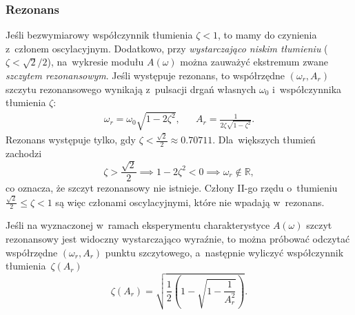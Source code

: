 \documentclass[paper=a4,DIV=12]{lpas}
\begin{document}
\begin{appendices}
  \subsubsection{Rezonans}
  \label{sec:8N4ZW}

  Jeśli bezwymiarowy współczynnik tłumienia $\zeta < 1$, to mamy do czynienia
  z~członem oscylacyjnym. Dodatkowo, przy {\em wystarczająco niskim tłumieniu}
  ($\zeta < \sqrt{2}/{2}$), na~wykresie modułu $A(\omega)$ można zauważyć
  ekstremum zwane {\em szczytem rezonansowym}. Jeśli występuje rezonans, to
  współrzędne $(\omega_r, A_r)$ szczytu rezonansowego wynikają z~pulsacji drgań
  własnych $\omega_0$ i~współczynnika tłumienia $\zeta$:
  \begin{equation}
    \begin{aligned}
      &
      \omega_r = \omega_0 \sqrt{1 - 2 \zeta^2},
      &&
      A_r = \frac{1}{2 \zeta \sqrt{1 - \zeta^2}}.
      &
    \end{aligned}
    \label{eq:EMIVT}
  \end{equation}
  Rezonans występuje tylko, gdy $\zeta < \frac{\sqrt{2}}{2} \approx 0.70711$.
  Dla~większych tłumień zachodzi
  \begin{equation}
    \zeta > \frac{\sqrt{2}}{2} \implies 1 - 2\zeta^2 < 0 \implies \omega_r \notin \mathbb{R},
  \end{equation}
  co oznacza, że szczyt rezonansowy nie istnieje. Człony II-go rzędu o~tłumieniu
  $\frac{\sqrt{2}}{2} \le \zeta < 1$ są więc członami oscylacyjnymi, które nie
  wpadają w~rezonans.

  Jeśli na wyznaczonej w~ramach eksperymentu charakterystyce $A(\omega)$ szczyt
  rezonansowy jest widoczny wystarczająco wyraźnie, to można próbować odczytać
  współrzędne $(\omega_r, A_r)$ punk\-tu szczytowego, a~następnie wyliczyć
  współczynnik tłumienia~$\zeta(A_r)$
  \begin{equation}
    \zeta(A_r) = \sqrt{\frac{1}{2}\left(1 - \sqrt{1 - \frac{1}{A_r^2}}\right)}.
    \label{eq:SZENE}
  \end{equation}


\end{appendices}
\end{document}
